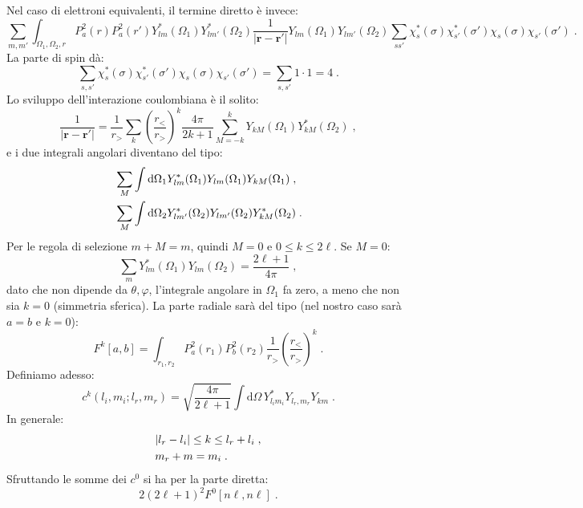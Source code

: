 \documentclass[12pt,a4paper]{report}
\theoremstyle{definition}
\numberwithin{equation}{section}
\newcommand{\diff}[1][]{\mathrm{d}#1}
\begin{document}
Nel caso di elettroni equivalenti, il termine diretto è invece:
\begin{equation}
\sum_{m,m'}\int_{\Omega_1,\Omega_2,r}P_a^2(r)P_a^2(r')Y_{lm}^*(\Omega_1)Y_{lm'}^*(\Omega_2)\frac{1}{|\mathbf{r}-\mathbf{r}'|}Y_{lm}(\Omega_1)Y_{lm'}(\Omega_2)\sum_{ss'}\chi_s^*(\sigma)\chi_{s'}^*(\sigma')\chi_s(\sigma)\chi_{s'}(\sigma')\;.
\end{equation}
La parte di spin dà:
\begin{equation}
\sum_{s,s'}\chi_s^*(\sigma)\chi_{s'}^*(\sigma')\chi_s(\sigma)\chi_{s'}(\sigma')=\sum_{s,s'}1\cdot 1=4\;.
\end{equation}
Lo sviluppo dell'interazione coulombiana è il solito:
\begin{equation}
\frac{1}{|\mathbf{r}-\mathbf{r}'|}=\frac{1}{r_>}\sum_k\left(\frac{r_<}{r_>}\right)^k\frac{4\pi}{2k+1}\sum_{M=-k}^kY_{kM}(\Omega_1)Y_{kM}^*(\Omega_2)\;,
\end{equation}
e i due integrali angolari diventano del tipo:
\begin{align}
&\sum_M\int\diff{\Omega_1} Y_{lm}^*(\Omega_1)Y_{lm}(\Omega_1)Y_{kM}(\Omega_1) \notag\;, \\
&\sum_M\int\diff{\Omega_2} Y_{lm'}^*(\Omega_2)Y_{lm'}(\Omega_2)Y^*_{kM}(\Omega_2)\;.
\end{align}
Per le regola di selezione $m+M=m$, quindi $M=0$ e $0\le k\le 2\ell$. Se $M=0$:
\begin{equation}
\sum_m Y_{lm}^*(\Omega_1)Y_{lm}(\Omega_2)=\frac{2\ell+1}{4\pi}\;,
\end{equation}
dato che non dipende da $\theta,\varphi$, l'integrale angolare in $\Omega_1$ fa zero, a meno che non sia $k=0$ (simmetria sferica). La parte radiale sarà del tipo (nel nostro caso sarà $a=b$ e $k=0$):
\begin{equation}
F^k[a,b]=\int_{r_1,r_2} P_a^2(r_1)P_b^2(r_2)\frac{1}{r_>}\left(\frac{r_<}{r_>}\right)^k\;.
\end{equation}
Definiamo adesso:
\begin{equation}
c^k(l_i,m_i;l_r,m_r)=\sqrt{\frac{4\pi}{2\ell+1}}\int\diff{\Omega}\,Y_{l_im_i}^*Y_{l_r,m_r}Y_{km}\;.
\end{equation}
In generale:
\begin{align}
&|l_r-l_i|\le k\le l_r+l_i \notag\;, \\
&m_r+m=m_i\;.
\end{align}
Sfruttando le somme dei $c^0$ si ha per la parte diretta:
\begin{equation}
2(2\ell+1)^2F^0[n\ell,n\ell]\;.
\end{equation}
\end{document}
